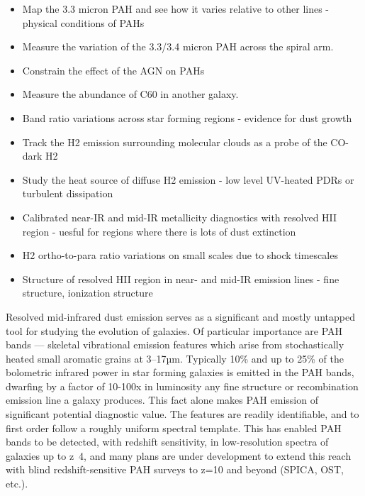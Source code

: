 \documentclass[12pt]{article}
\begin{document}
\vspace{0.1in}


\begin{itemize}
    \item{Map the 3.3 micron PAH and see how it varies relative to other lines - physical conditions of PAHs}
    \item{Measure the variation of the 3.3/3.4 micron PAH across the spiral arm.}
    \item{Constrain the effect of the AGN on PAHs}
    \item{Measure the abundance of C60 in another galaxy.}
    \item{Band ratio variations across star forming regions - evidence for dust growth}
    \item{Track the H2 emission surrounding molecular clouds as a probe of the CO-dark H2}
    \item{Study the heat source of diffuse H2 emission - low level UV-heated PDRs or turbulent dissipation}
    \item{Calibrated near-IR and mid-IR metallicity diagnostics with resolved HII region - uesful for regions where there is lots of dust extinction}
    \item{H2 ortho-to-para ratio variations on small scales due to shock timescales}
    \item{Structure of resolved HII region in near- and mid-IR emission lines - fine structure, ionization structure}
\end{itemize}

Resolved mid-infrared dust emission serves as a significant and mostly untapped tool for studying the evolution of galaxies. Of particular importance are PAH bands — skeletal vibrational emission features which arise from stochastically heated small aromatic grains at 3–17µm. Typically 10\% and up to 25\% of the bolometric infrared power in star forming galaxies is emitted in the PAH bands, dwarfing by a factor of 10-100x in luminosity any fine structure or recombination emission line a galaxy produces.  This fact alone makes PAH emission of significant potential diagnostic value.  The features are readily identifiable, and to first order follow a roughly uniform spectral template.  This has enabled PAH bands to be detected, with redshift sensitivity, in low-resolution spectra of galaxies up to z~4, and many plans are under development to extend this reach with blind redshift-sensitive PAH surveys to z=10 and beyond (SPICA, OST, etc.).   
\end{document}
